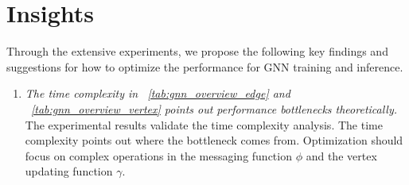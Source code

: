\section{Insights}
\label{sec:insights}

Through the extensive experiments, we propose the following key findings and suggestions for how to optimize the performance for GNN training and inference.

\begin{enumerate}
    \item \emph{The time complexity in \tablename~\ref{tab:gnn_overview_edge} and \tablename~\ref{tab:gnn_overview_vertex} points out performance bottlenecks theoretically.}
          The experimental results validate the time complexity analysis.
          The time complexity points out where the bottleneck comes from.
          Optimization should focus on complex operations in the messaging function $\phi$ and the vertex updating function $\gamma$.


\end{enumerate}
